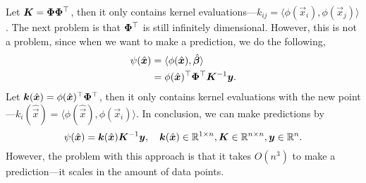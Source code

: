 Let $\bm{K} = \bm{\Phi} \bm{\Phi}^\top$, then it only contains kernel evaluations---$k_{ij} = \langle \phi(\vec{x}_i), \phi(\vec{x}_j) \rangle$. The next problem is that $\bm{\Phi}^\top$ is still infinitely dimensional. However, this is not a problem, since when we want to make a prediction, we do the following,
\begin{align*}
    \psi(\hat{\bm{x}}) & = \langle \phi(\hat{\bm{x}}), \hat{\bm{\beta}} \rangle                        \\
                        & = \phi(\hat{\bm{x}})^\top \bm{\Phi}^\top \bm{K}^{-1} \bm{y}.
\end{align*}
Let $\bm{k}(\hat{\bm{x}}) = \phi(\hat{\bm{x}})^\top \bm{\Phi}^\top$, then it only contains kernel evaluations with the new point---$k_i(\hat{\vec{x}}) = \langle \phi(\hat{\vec{x}}), \phi(\vec{x}_i) \rangle$. In conclusion, we can make predictions by \[
    \psi(\hat{\bm{x}}) = \bm{k}(\hat{\bm{x}}) \bm{K}^{-1} \bm{y}, \quad \bm{k}(\hat{\bm{x}}) \in \mathbb{R}^{1 \times n}, \bm{K} \in \mathbb{R}^{n \times n}, \bm{y} \in \mathbb{R}^n.
\]
However, the problem with this approach is that it takes $O(n^3)$ to make a prediction---it scales
in the amount of data points.
